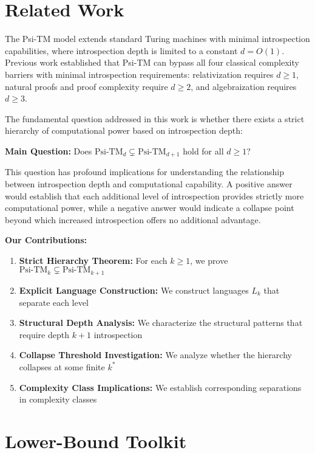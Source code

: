 
\section{Related Work}

The Psi-TM model extends standard Turing machines with minimal introspection capabilities, where introspection depth is limited to a constant $d = O(1)$. Previous work established that Psi-TM can bypass all four classical complexity barriers with minimal introspection requirements: relativization requires $d \geq 1$, natural proofs and proof complexity require $d \geq 2$, and algebraization requires $d \geq 3$.

The fundamental question addressed in this work is whether there exists a strict hierarchy of computational power based on introspection depth:

\textbf{Main Question:} Does $\text{Psi-TM}_d \subsetneq \text{Psi-TM}_{d+1}$ hold for all $d \geq 1$?

This question has profound implications for understanding the relationship between introspection depth and computational capability. A positive answer would establish that each additional level of introspection provides strictly more computational power, while a negative answer would indicate a collapse point beyond which increased introspection offers no additional advantage.

\textbf{Our Contributions:}
\begin{enumerate}
\item \textbf{Strict Hierarchy Theorem:} For each $k \geq 1$, we prove $\text{Psi-TM}_k \subsetneq \text{Psi-TM}_{k+1}$
\item \textbf{Explicit Language Construction:} We construct languages $L_k$ that separate each level
\item \textbf{Structural Depth Analysis:} We characterize the structural patterns that require depth $k+1$ introspection
\item \textbf{Collapse Threshold Investigation:} We analyze whether the hierarchy collapses at some finite $k^*$
\item \textbf{Complexity Class Implications:} We establish corresponding separations in complexity classes
\end{enumerate}

\section{Lower-Bound Toolkit}

